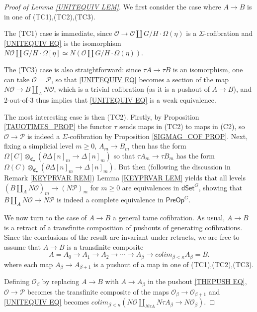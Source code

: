 \documentclass[a4paper,10pt
,draft
]{article}%
\numberwithin{equation}{section}
\numberwithin{figure}{section}
\theoremstyle{definition} %
\renewcommand{\O}{\ensuremath{\mathcal O}}
\renewcommand{\P}{\ensuremath{\mathcal P}}
\newcommand{\1}{\ensuremath{\mathbbm 1}}%
\begin{document}
\begin{proof}[Proof of Lemma \ref{UNITEQUIV LEM}]
	We first consider the case where $A\to B$ is in one of (TC1),(TC2),(TC3).
	
	The (TC1) case is immediate, 
	since $\mathcal{O} \to \mathcal{O} \amalg G/H \cdot \Omega(\eta)$ is a $\Sigma$-cofibration and
	\eqref{UNITEQUIV EQ}
	is the isomorphism
	$N\mathcal{O} \amalg G/H\cdot \Omega[\eta] \simeq 
	N\left( \mathcal{O} \amalg G/H \cdot \Omega(\eta) \right)$.
	
	The (TC3) case is also straightforward:
	since $\tau A \to \tau B$ is an isomorphism, one can take 
	$\mathcal{O}=\mathcal{P}$, so that 
	\eqref{UNITEQUIV EQ}
	becomes a section of the map
	$N \mathcal{O} \to B \amalg_{A} N \mathcal{O}$, which is a trivial cofibration (as it is a pushout of $A \to B$),
	and 2-out-of-3 thus implies that \eqref{UNITEQUIV EQ} is a weak equivalence.

	The most interesting case is then (TC2).
	Firstly, by Proposition \ref{TAUOTIMES_PROP} the functor $\tau$ sends maps in (TC2) to maps in (C2), 
	so $\O \to \P$ is indeed a $\Sigma$-cofibration
	by {\color{red} Proposition \ref{SIGMAG_COF PROP}}.
	Next, fixing a simplicial level $m\geq 0$,
	$A_m \to B_m$ then has the form
	$\Omega[C] \otimes_{\mathfrak{C}_{\bullet}} \left(\partial \Delta[n]_m \to \Delta[n]_m\right)$ so that
	$\tau A_m \to \tau B_m$ has the form
	$\Omega(C) \otimes_{\mathfrak{C}_{\bullet}} \left(\partial \Delta[n]_m \to \Delta[n]_m\right)$.
	But then (following the discussion in 
	Remark \ref{KEYPRVAR REM})
	Lemma \ref{KEYPRVAR LEM}
	yields that all levels
	$(B \amalg_{A} N \mathcal{O})_m
	\to 
	(N \mathcal{P})_m$
	for $m \geq 0$
	are equivalences in $\mathsf{dSet}^G$,
	showing that 
	$B \amalg_{A} N \mathcal{O}
	\to 
	N \mathcal{P}$
	is indeed a complete equivalence in
	$\mathsf{PreOp}^G$.

	We now turn to the case of $A \to B$ a general tame cofibration.
	As usual, $A \to B$ is a retract of a transfinite composition of pushouts of generating cofibrations.
	Since the conclusions of the result are invariant under retracts,
	we are free to assume that $A \to B$ is a transfinite composite
	\[
	A = A_0 \to A_1 \to A_2 \to \cdots \to A_{\beta} \to 
	colim_{\beta < \kappa} A_{\beta} = B.
	\]
	where each map $A_{\beta} \to A_{\beta +1}$ is a pushout of a map in one of (TC1),(TC2),(TC3).

	Defining $\mathcal{O}_{\beta}$ by replacing $A \to B$ with $A \to A_{\beta}$ in the pushout \eqref{THEPUSH EQ},
	$\mathcal{O} \to \mathcal{P}$ becomes the transfinite composite of the maps $\mathcal{O}_{\beta} \to \mathcal{O}_{\beta + 1}$
	and \eqref{UNITEQUIV EQ} becomes
	$
	colim_{\beta < \kappa} \left( 
	N \mathcal{O} \amalg_{N \tau A} N \tau A_{\beta}
	\to 
	N \mathcal{O}_{\beta}
	\right)
	$.


\end{proof}
\end{document}
